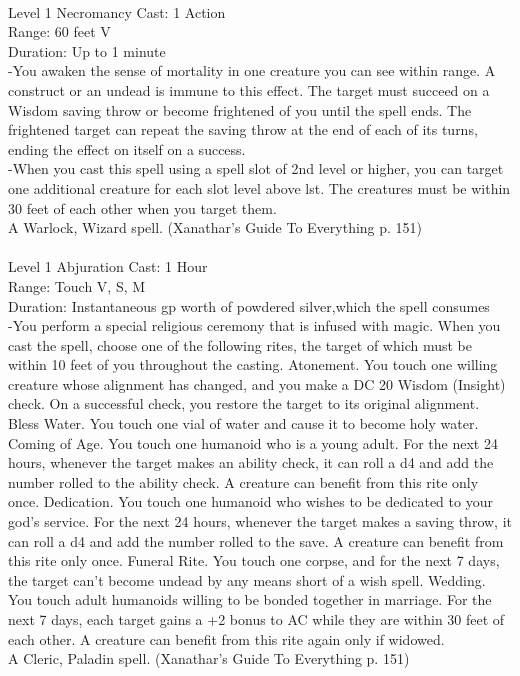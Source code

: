 \documentclass[10pt,twocolumn]{report}
\begin{document}
 \\
Level 1 \quad Necromancy \quad Cast: 1 Action\\
Range: 60 feet \quad V\\
Duration: Up to 1 minute \quad \\
-You awaken the sense of mortality in one creature you can see within range. A construct or an undead is immune to this effect. The target must succeed on a Wisdom saving throw or become frightened of you until the spell ends. The frightened target can repeat the saving throw at the end of each of its turns, ending the effect on itself on a success.\\
-When you cast this spell using a spell slot of 2nd level or higher, you can target one additional creature for each slot level above lst. The creatures must be within 30 feet of each other when you target them.\\
A Warlock, Wizard spell. (Xanathar's Guide To Everything p. 151) \\


 \\
Level 1 \quad Abjuration \quad Cast: 1 Hour\\
Range: Touch \quad V, S, M\\
Duration: Instantaneous  gp worth of powdered silver,which the spell consumes\\
-You perform a special religious ceremony that is infused with magic. When you cast the spell, choose one of the following rites, the target of which must be within 10 feet of you throughout the casting.
Atonement. You touch one willing creature whose alignment has changed, and you make a DC 20 Wisdom (Insight) check. On a successful check, you restore the target to its original alignment.
Bless Water. You touch one vial of water and cause it to become holy water.
Coming of Age. You touch one humanoid who is a young adult. For the next 24 hours, whenever the target makes an ability check, it can roll a d4 and add the number rolled to the ability check. A creature can benefit from this rite only once.
Dedication. You touch one humanoid who wishes to be dedicated to your god’s service. For the next 24 hours, whenever the target makes a saving throw, it can roll a d4 and add the number rolled to the save. A creature can benefit from this rite only once.
Funeral Rite. You touch one corpse, and for the next 7 days, the target can’t become undead by any means short of a wish spell.
Wedding. You touch adult humanoids willing to be bonded together in marriage. For the next 7 days, each target gains a +2 bonus to AC while they are within 30 feet of each other. A creature can benefit from this rite again only if widowed.\\
A Cleric, Paladin spell. (Xanathar's Guide To Everything p. 151) \\
\end{document}
